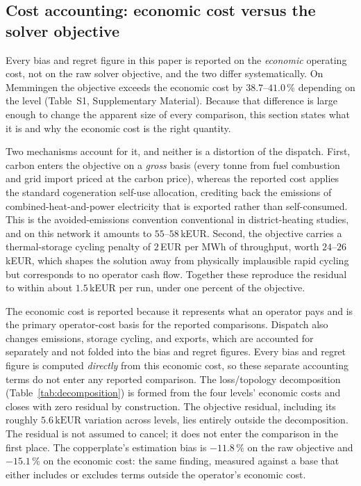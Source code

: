 
\subsection{Cost accounting: economic cost versus the solver objective}
\label{subsec:costacct}

Every bias and regret figure in this paper is reported on the \emph{economic} operating
cost, not on the raw solver objective, and the two differ systematically. On Memmingen the
objective exceeds the economic cost by $38.7$--$41.0$\,\% depending on the level
(Table~S1, Supplementary Material). Because that difference is large enough to change the
apparent size of every comparison, this section states what it is and why the economic cost is the
right quantity.

Two mechanisms account for it, and neither is a distortion of the dispatch. First, carbon
enters the objective on a \emph{gross} basis (every tonne from fuel combustion and grid
import priced at the carbon price), whereas the reported cost applies the standard
cogeneration self-use allocation, crediting back the emissions of combined-heat-and-power
electricity that is exported rather than self-consumed. This is the avoided-emissions
convention conventional in district-heating studies, and on this network it amounts to
$55$--$58$\,kEUR. Second, the objective carries a thermal-storage cycling penalty of
$2$\,EUR per MWh of throughput, worth $24$--$26$\,kEUR, which shapes the solution away from
physically implausible rapid cycling but corresponds to no operator cash flow. Together
these reproduce the residual to within about $1.5$\,kEUR per run, under one percent of the
objective.

The economic cost is reported because it represents what an operator pays and is the primary
operator-cost basis for the reported comparisons. Dispatch also changes emissions, storage
cycling, and exports, which are accounted for separately and not folded into the bias and regret
figures. Every bias and regret figure is computed \emph{directly} from this economic cost, so
these separate accounting terms do not enter any reported comparison. The loss/topology
decomposition (Table~\ref{tab:decomposition}) is formed from the four levels' economic costs and
closes with zero residual by construction. The objective residual, including its roughly
\(5.6\,\mathrm{kEUR}\) variation across levels, lies entirely outside the decomposition. The
residual is not assumed to cancel; it does not enter the comparison in the first place. The
copperplate's estimation bias is \(-11.8\,\%\) on the raw objective and
\(\mathbf{-15.1}\,\%\) on the economic cost: the same finding, measured against a base that
either includes or excludes terms outside the operator's economic cost.

